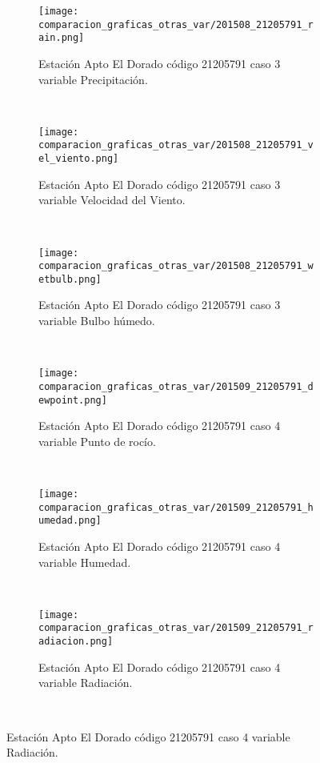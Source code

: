 \begin{figure}[H]
\centering
\begin{subfigure}[normla]{0.4\textwidth}
\caption{Estación Apto El Dorado código 21205791 caso 3 variable Precipitación.}
\texttt{[image: comparacion\_graficas\_otras\_var/201508\_21205791\_rain.png]}
\end{subfigure}
~
\begin{subfigure}[normla]{0.4\textwidth}
\caption{Estación Apto El Dorado código 21205791 caso 3 variable Velocidad del Viento.}
\texttt{[image: comparacion\_graficas\_otras\_var/201508\_21205791\_vel\_viento.png]}
\end{subfigure}
~
\begin{subfigure}[normla]{0.4\textwidth}
\caption{Estación Apto El Dorado código 21205791 caso 3 variable Bulbo húmedo.}
\texttt{[image: comparacion\_graficas\_otras\_var/201508\_21205791\_wetbulb.png]}
\end{subfigure}
~
\begin{subfigure}[normla]{0.4\textwidth}
\caption{Estación Apto El Dorado código 21205791 caso 4 variable Punto de rocío.}
\texttt{[image: comparacion\_graficas\_otras\_var/201509\_21205791\_dewpoint.png]}
\end{subfigure}
~
\begin{subfigure}[normla]{0.4\textwidth}
\caption{Estación Apto El Dorado código 21205791 caso 4 variable Humedad.}
\texttt{[image: comparacion\_graficas\_otras\_var/201509\_21205791\_humedad.png]}
\end{subfigure}
~
\begin{subfigure}[normla]{0.4\textwidth}
\caption{Estación Apto El Dorado código 21205791 caso 4 variable Radiación.}
\texttt{[image: comparacion\_graficas\_otras\_var/201509\_21205791\_radiacion.png]}
\end{subfigure}
~
\end{figure}
           
